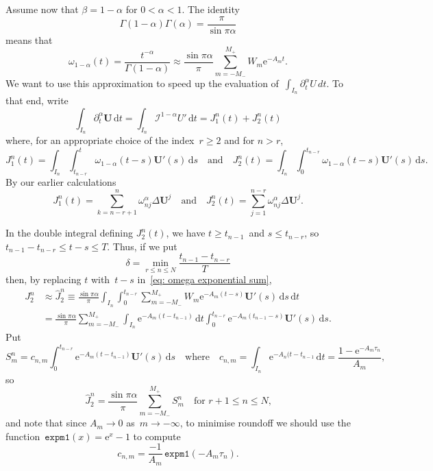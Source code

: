 \documentclass[a4paper,12pt]{article}
\newcommand{\bs}[1]{\boldsymbol{#1}}
\newcommand{\ud}{\mathrm{d}}
\newcommand{\ue}{\mathrm{e}}
\begin{document}
Assume now that $\beta=1-\alpha$ for $0<\alpha<1$.  The identity
\[
\Gamma(1-\alpha)\Gamma(\alpha)=\frac{\pi}{\sin\pi\alpha}
\]
means that
\begin{equation}\label{eq: omega exponential sum}
\omega_{1-\alpha}(t)=\frac{t^{-\alpha}}{\Gamma(1-\alpha)}
    \approx\frac{\sin\pi\alpha}{\pi}\sum_{m=-M_-}^{M_+}W_m\ue^{-A_mt}.
\end{equation}
We want to use this approximation to speed up the evaluation
of~$\int_{I_n}\partial_t^\alpha U\,dt$.  To that end, write
\[
\int_{I_n}\partial_t^\alpha\bs{U}\,\ud t
    =\int_{I_n}\mathcal{I}^{1-\alpha}U'\,\ud t=J^n_1(t)+J^n_2(t)
\]
where, for an appropriate choice of the index~$r\ge2$ and for $n>r$,
\[
J^n_1(t)=\int_{I_n}\int_{t_{n-r}}^t\omega_{1-\alpha}(t-s)\bs{U}'(s)\,\ud s
\quad\text{and}\quad
J^n_2(t)=\int_{I_n}\int_0^{t_{n-r}}\omega_{1-\alpha}(t-s)\bs{U}'(s)\,\ud s.
\]
By our earlier calculations
\[
J_1^n(t)=\sum_{k=n-r+1}^n \omega^\alpha_{nj}\Delta\bs{U}^j
\quad\text{and}\quad
J_2^n(t)=\sum_{j=1}^{n-r}\omega^\alpha_{nj}\Delta\bs{U}^j.
\]

In the double integral defining $J^n_2(t)$, we have $t\ge t_{n-1}$~and
$s\le t_{n-r}$, so $t_{n-1}-t_{n-r}\le t-s\le T$.  Thus, if we put
\[
\delta=\min_{r\le n\le N}\frac{t_{n-1}-t_{n-r}}{T}
\]
then, by replacing $t$ with~$t-s$ in~\eqref{eq: omega exponential sum},
\begin{align*}
J_2^n&\approx \hat J_2^n\equiv\frac{\sin\pi\alpha}{\pi}\int_{I_n}
    \int_0^{t_{n-r}}\sum_{m=-M_-}^{M_+}
        W_m\ue^{-A_m(t-s)}\bs{U}'(s)\,\ud s\,\ud t\\
    &=\frac{\sin\pi\alpha}{\pi}\sum_{m=-M_-}^{M_+}
    \int_{I_n}\ue^{-A_m(t-t_{n-1})}\,\ud t
    \int_0^{t_{n-r}}\ue^{-A_m(t_{n-1}-s)}\bs{U}'(s)\,\ud s.
\end{align*}
Put
\[
S^n_m= c_{n,m}\int_0^{t_{n-r}}\ue^{-A_m(t-t_{n-1})}\bs{U}'(s)\,\ud s
\quad\text{where}\quad
c_{n,m}=\int_{I_n}\ue^{-A_n(t-t_{n-1}}\,\ud t=\frac{1-\ue^{-A_m\tau_n}}{A_m},
\]
so
\[
\hat J^n_2=\frac{\sin\pi\alpha}{\pi}\sum_{m=-M_-}^{M_+} S^n_m
    \quad\text{for $r+1\le n\le N$,}
\]
and note that since $A_m\to0$ as~$m\to-\infty$, to minimise roundoff we should
use the function~$\mathtt{expm1}(x)=\ue^x-1$ to compute
\[
c_{n,m}=\frac{-1}{A_m}\,\mathtt{expm1}(-A_m\tau_n).
\]
\end{document}
